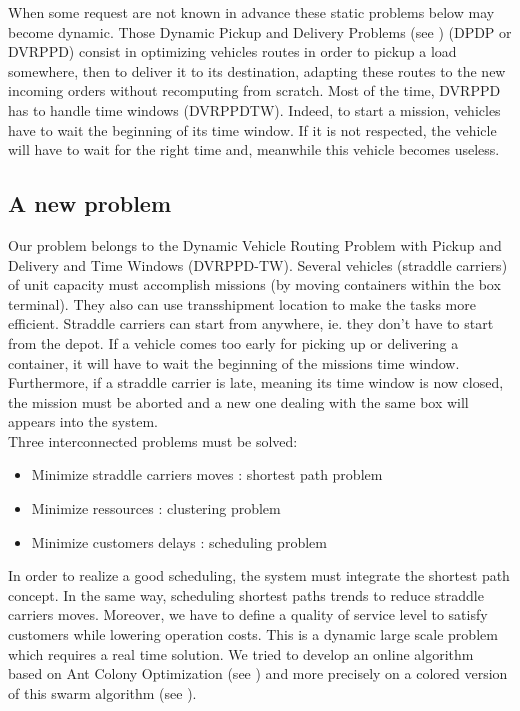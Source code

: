 \documentclass[a4paper,10pt]{article}
\begin{document}
\begin{multicols}{2}
When some request are not known in advance these static problems below may become dynamic. Those Dynamic Pickup and Delivery Problems (see \cite{Mitrovic01,Mitrovic04,Mitrovic98}) (DPDP or DVRPPD) consist in optimizing vehicles routes in order to pickup a load somewhere, then to deliver it to its destination, adapting these routes to the new incoming orders without recomputing from scratch. Most of the time, DVRPPD has to handle time windows (DVRPPDTW). Indeed, to start a mission, vehicles have to wait the beginning of its time window. If it is not respected, the vehicle will have to wait for the right time and, meanwhile this vehicle becomes useless.\\

\subsection{A new problem}

Our problem belongs to the Dynamic Vehicle Routing Problem with Pickup and Delivery and Time Windows (DVRPPD-TW). Several vehicles (straddle carriers) of unit capacity must accomplish missions (by moving containers within the box terminal). They also can use transshipment location to make the tasks more efficient. Straddle carriers can start from anywhere, ie. they don't have to start from the depot. If a vehicle comes too early for picking up or delivering a container, it will have to wait the beginning of the missions time window. Furthermore, if a straddle carrier is late, meaning its time window is now closed, the mission must be aborted and a new one dealing with the same box will appears into the system.\\

Three interconnected problems must be solved:
\begin{itemize}
	\item Minimize straddle carriers moves : shortest path problem
	\item Minimize ressources : clustering problem
	\item Minimize customers delays : scheduling problem
\end{itemize}

In order to realize a good scheduling, the system must integrate the shortest path concept. In the same way, scheduling shortest paths trends to reduce straddle carriers moves. Moreover, we have to define a quality of service level to satisfy customers while lowering operation costs. This is a dynamic large scale problem which requires a real time solution. We tried to develop an online algorithm based on Ant Colony Optimization (see \cite{Dorigo91,Dorigo97}) and more precisely on a colored version of this swarm algorithm (see \cite{Bertelle02}).


\end{multicols}
\end{document}
